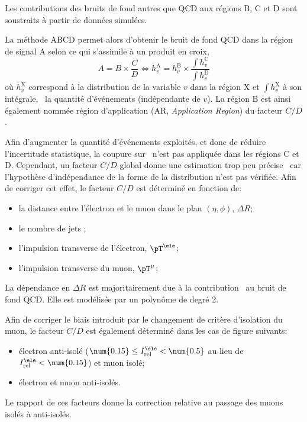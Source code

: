Les contributions des bruits de fond autres que QCD aux régions B, C et D sont soustraits à partir de données simulées.
\par
La méthode ABCD permet alors d'obtenir le bruit de fond QCD dans la région de signal A selon ce qui s'assimile à un produit en croix,
\begin{equation}
A = B \times \frac{C}{D} \Leftrightarrow h_v^\text{A} = h_v^\text{B} \times \frac{\int h_v^\text{C}}{\int h_v^\text{D}}
\end{equation}
où $h_v^\text{X}$ correspond à la distribution de la variable $v$ dans la région X et $\int h_v^\text{X}$ à son intégrale, \ie\ la quantité d'événements (indépendante de $v$).
La région B est ainsi également nommée région d'application (AR, \emph{Application Region}) du facteur $C/D$.
\par
Afin d'augmenter la quantité d'événements exploités, et donc de réduire l'incertitude statistique, la coupure sur \Dzeta\ n'est pas appliquée dans les régions C et D.
Cependant, un facteur $C/D$ global donne une estimation trop peu précise~\cite{CMS-PAS-HIG-18-032} car l'hypothèse d'indépendance de la forme de la distribution n'est pas vérifiée.
Afin de corriger cet effet, le facteur $C/D$ est déterminé en fonction de:
\begin{itemize}
\item la distance entre l'électron et le muon dans le plan $(\eta,\phi)$, $\Delta R$;
\item le nombre de jets \Njets;
\item l'impulsion transverse de l'électron, $\pT^{\ele}$;
\item l'impulsion transverse du muon, $\pT^{\mu}$;
\end{itemize}
La dépendance en $\Delta R$ est majoritairement due à la contribution \quarkb\antiquarkb\ au bruit de fond QCD.
Elle est modélisée par un polynôme de degré 2.
\par
Afin de corriger le biais introduit par le changement de critère d'isolation du muon, le facteur $C/D$ est également déterminé dans les cas de figure suivants:
\begin{itemize}
\item électron anti-isolé ($\num{0.15}\leq I_\text{rel}^{\ele} < \num{0.5}$ au lieu de $I_\text{rel}^{\ele} < \num{0.15}$) et muon isolé;
\item électron et muon anti-isolés.
\end{itemize}
Le rapport de ces facteurs donne la correction relative au passage des muons isolés à anti-isolés.